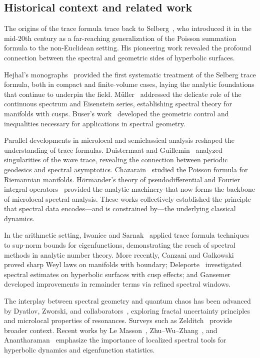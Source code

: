 \subsection{Historical context and related work}\label{subsec:history}

The origins of the trace formula trace back to Selberg~\cite{Selberg1956}, who introduced it in the mid-20th century as a far-reaching generalization of the Poisson summation formula to the non-Euclidean setting. His pioneering work revealed the profound connection between the spectral and geometric sides of hyperbolic surfaces.

Hejhal’s monographs~\cite{Hejhal1976,Hejhal1983} provided the first systematic treatment of the Selberg trace formula, both in compact and finite-volume cases, laying the analytic foundations that continue to underpin the field. M\"uller~\cite{Mueller1983} addressed the delicate role of the continuous spectrum and Eisenstein series, establishing spectral theory for manifolds with cusps. Buser’s work~\cite{Buser1992} developed the geometric control and inequalities necessary for applications in spectral geometry.

Parallel developments in microlocal and semiclassical analysis reshaped the understanding of trace formulas. Duistermaat and Guillemin~\cite{DuistermaatGuillemin1975} analyzed singularities of the wave trace, revealing the connection between periodic geodesics and spectral asymptotics. Chazarain~\cite{Chazarain1974} studied the Poisson formula for Riemannian manifolds. Hörmander’s theory of pseudodifferential and Fourier integral operators~\cite{Hormander1994III} provided the analytic machinery that now forms the backbone of microlocal spectral analysis. These works collectively established the principle that spectral data encodes—and is constrained by—the underlying classical dynamics.

In the arithmetic setting, Iwaniec and Sarnak~\cite{IwaniecSarnak1995} applied trace formula techniques to sup-norm bounds for eigenfunctions, demonstrating the reach of spectral methods in analytic number theory. More recently, Canzani and Galkowski~\cite{CanzaniGalkowski2019} proved sharp Weyl laws on manifolds with boundary; Deleporte~\cite{Deleporte2024} investigated spectral estimates on hyperbolic surfaces with cusp effects; and Gansemer~\cite{Gansemer2024a,Gansemer2024b} developed improvements in remainder terms via refined spectral windows.

The interplay between spectral geometry and quantum chaos has been advanced by Dyatlov, Zworski, and collaborators~\cite{Dyatlov2018,DyatlovZworski2019,DyatlovZworski2019b}, exploring fractal uncertainty principles and microlocal properties of resonances. Surveys such as Zelditch~\cite{Zelditch2009} provide broader context. Recent works by Le Masson~\cite{LeMasson2024}, Zhu--Wu--Zhang~\cite{ZhuWuZhang2024}, and Anantharaman~\cite{Anantharaman2024} emphasize the importance of localized spectral tools for hyperbolic dynamics and eigenfunction statistics.

